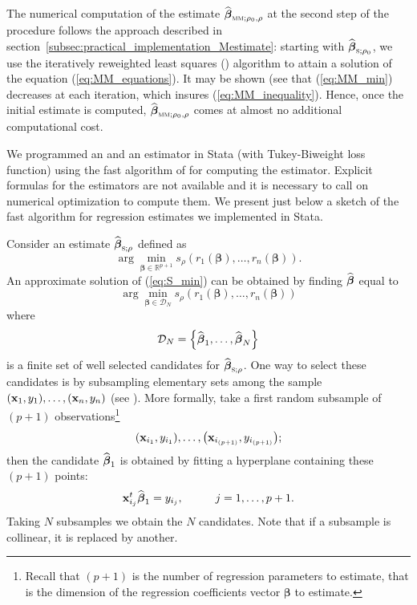 The numerical computation of the estimate
$\sthat{\boldsymbol\beta}_{\stsc{MM};\rho_{0},\rho}$ at the second step of the
procedure follows the approach described in
section~\ref{subsec:practical_implementation_Mestimate}: starting with
$\sthat{\boldsymbol\beta}_{\stsc{S};\rho_{0}}$, we use the iteratively
reweighted least squares () algorithm to attain a solution of the
equation (\ref{eq:MM_equations}). It may be shown (see
\citet{maronna:etal:2006} that (\ref{eq:MM_min}) decreases at each iteration,
which insures (\ref{eq:MM_inequality}). Hence, once the initial 
estimate is computed, $\sthat{\boldsymbol\beta}_{\stsc{MM};\rho_{0},\rho}$
comes at almost no additional computational cost.

We programmed an  and an  estimator in Stata (with
Tukey-Biweight loss function) using the fast algorithm of
\citet{salibian:yohai:2006} for computing the  estimator. Explicit
formulas for the estimators are not available and it is necessary to call on
numerical optimization to compute them. We present just below a sketch of the
fast algorithm for regression  estimates we implemented in Stata.

Consider an estimate $\sthat{\boldsymbol\beta}_{\stsc{S};\rho}$ defined
as
\begin{equation}
\arg\min_{\boldsymbol\beta\in%
\mathbb{R}
^{p+1}}s_{\rho}\left(  r_{1}\left(  \boldsymbol\beta\right)  ,\ldots
,r_{n}\left(  \boldsymbol\beta\right)  \right)  . \label{eq:S_min}%
\end{equation}
An approximate solution of (\ref{eq:S_min}) can be obtained by finding
$\widehat{\boldsymbol\beta}$ equal to
\[
\arg\min_{\boldsymbol\beta\in\mathcal{D}_{N}}s_{\rho}\left(  r_{1}\left(
\boldsymbol\beta\right)  ,\ldots,r_{n}\left(  \boldsymbol\beta\right)
\right)
\]
where
\[
\mathcal{D}_{N}=\left\{  \sthat{\boldsymbol\beta}_{1},\ldots
,\sthat{\boldsymbol\beta}_{N}\right\}
\]
is a finite set of well selected candidates for $\sthat{\boldsymbol\beta%
}_{\stsc{S};\rho}$. One way to select these candidates is by subsampling
elementary sets among the sample $\left(  \stvec{x}_{1},y_{1}\right)
,\ldots,\left(  \stvec{x}_{n},y_{n}\right)  $ (see \citealp{rousseeuw:1984}).
More formally, take a first random subsample of $(p+1)$
observations\footnote{Recall that $(p+1)$ is the number of regression
parameters to estimate, that is the dimension of the regression coefficients
vector $\boldsymbol\beta$ to estimate.}
\[
\left(  \stvec{x}_{i_{1}},y_{i_{1}}\right)  ,\ldots,\left(  \stvec{x}%
_{i_{(p+1)}},y_{i_{(p+1)}}\right)  ;
\]
then the candidate $\widehat{\boldsymbol\beta}_{1}$ is obtained by fitting a
hyperplane containing these $(p+1)$ points:
\[
\mathbf x_{i_{j}}^{t}\widehat{\boldsymbol\beta}_{1}=y_{i_{j}},\hspace
{1cm}j=1,\ldots,p+1.
\]
Taking $N$ subsamples we obtain the $N$ candidates. Note that if a subsample
is collinear, it is replaced by another.

